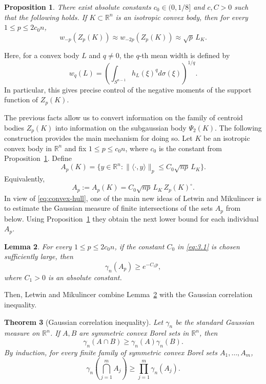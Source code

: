 \documentclass[10pt,a4paper]{amsart}
\newtheorem{theorem}{Theorem}[section]
\newtheorem{lemma}[theorem]{Lemma}
\newtheorem{proposition}[theorem]{Proposition}
\numberwithin{equation}{section}
\newcommand{\ls}{\leqslant}
\newcommand{\gr}{\geqslant}
\newcommand{\R}{\mathbb{R}}
\begin{document}
\begin{proposition}\label{prop:2.4}
There exist absolute constants $c_0 \in (0,1/8]$ and $c,C > 0$ such that the following holds.
If $K \subset \R^n$ is an isotropic convex body, then for every $1 \ls p \ls 2c_0n$,
\[w_{-p}(Z_p(K))\approx w_{-2p}(Z_p(K))\approx \sqrt{p}\,L_K.\]
\end{proposition}

Here, for a convex body $L$ and $q\neq 0$, the $q$-th mean width is defined by
\begin{equation}\label{eq:q-mean-width}w_q(L)=\left(\int_{S^{n-1}}h_L(\xi)^qd\sigma(\xi)\right)^{1/q}.\end{equation}
In particular, this gives precise control of the negative moments of the support function of $Z_p(K)$.

The previous facts allow us to convert information on the family of centroid bodies
$Z_p(K)$ into information on the subgaussian body $\Psi_2(K)$.
The following construction provides the main mechanism for doing so.
Let $K$ be an isotropic convex body in $\mathbb{R}^n$ and fix $1 \ls p \ls c_0n$, where $c_0$ is the constant from Proposition~\ref{prop:2.4}. Define
\begin{equation}\label{eq:3.1}
A_p(K)=\{y \in \R^n : \|\langle \cdot,y\rangle\|_p \ls C_0\sqrt{np}\,L_K\}.
\end{equation}
Equivalently,
\[A_p:=A_p(K) = C_0\sqrt{np}\,L_K\,Z_p(K)^\circ.\]
In view of \eqref{eq:convex-hull}, one of the main new ideas of Letwin and Mikulincer \cite{Letwin-Mikulincer-2026} is to 
estimate the Gaussian measure of finite intersections of the sets $A_p$ from below. Using Proposition~\ref{prop:2.4} they obtain
the next lower bound for each individual $A_p$.

\begin{lemma}\label{lem:2.6}
For every $1 \ls p \ls 2c_0n$, if the constant $C_0$ in \eqref{eq:3.1} is chosen sufficiently large, then
\[\gamma_n(A_p) \gr e^{-C_1p},\]
where $C_1>0$ is an absolute constant.
\end{lemma}

Then, Letwin and Mikulincer combine Lemma~\ref{lem:2.6} with the Gaussian correlation inequality.

\begin{theorem}[Gaussian correlation inequality]\label{th:2.5}
Let $\gamma_n$ be the standard Gaussian measure on $\R^n$. If $A,B$ are symmetric convex Borel sets in $\mathbb{R}^n$, then
\[\gamma_n(A \cap B) \gr \gamma_n(A)\gamma_n(B).\]
By induction, for every finite family of symmetric convex Borel sets $A_1,\dots,A_m$,
\[\gamma_n\left(\bigcap_{j=1}^m A_j\right)\gr\prod_{j=1}^m \gamma_n(A_j).\]
\end{theorem}
\end{document}
